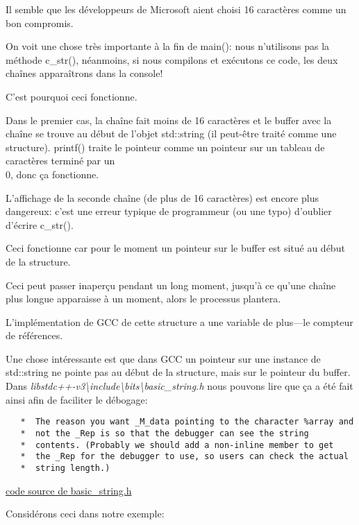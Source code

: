 Il semble que les développeurs de Microsoft aient choisi 16 caractères comme un bon
compromis.

On voit une chose très importante à la fin de main(): nous n'utilisons pas la méthode
c\_str(), néanmoins, si nous compilons et exécutons ce code, les deux chaînes apparaîtrons
dans la console!

C'est pourquoi ceci fonctionne.

Dans le premier cas, la chaîne fait moins de 16 caractères et le buffer avec la chaîne
se trouve au début de l'objet std::string (il peut-être traité comme une structure).
printf() traite le pointeur comme un pointeur sur un tableau de caractères terminé
par un \\0, donc ça fonctionne.

L'affichage de la seconde chaîne (de plus de 16 caractères) est encore plus dangereux:
c'est une erreur typique de programmeur (ou une typo) d'oublier d'écrire c\_str().

Ceci fonctionne car pour le moment un pointeur sur le buffer est situé au début de
la structure.

Ceci peut passer inaperçu pendant un long moment, jusqu'à ce qu'une chaîne plus longue
apparaisse à un moment, alors le processus plantera.


L'implémentation de GCC de cette structure a une variable de plus---le compteur de
références.

Une chose intéressante est que dans GCC un pointeur sur une instance de std::string
ne pointe pas au début de la structure, mais sur le pointeur du buffer.
Dans \emph{libstdc++-v3\textbackslash{}include\textbackslash{}bits\textbackslash{}basic\_string.h}
nous pouvons lire que ça a été fait ainsi afin de faciliter le débogage:

\begin{lstlisting}
   *  The reason you want _M_data pointing to the character %array and
   *  not the _Rep is so that the debugger can see the string
   *  contents. (Probably we should add a non-inline member to get
   *  the _Rep for the debugger to use, so users can check the actual
   *  string length.)
\end{lstlisting}

\href{http://gcc.gnu.org/onlinedocs/libstdc++/libstdc++-html-USERS-4.4/a01068.html}{code source de basic\_string.h}

Considérons ceci dans notre exemple:



